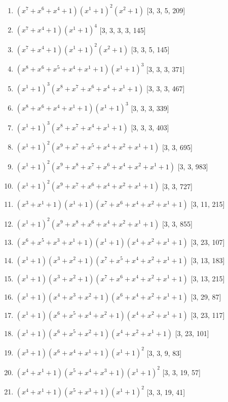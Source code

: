 \documentclass[10pt,twocolumn]{article}
\begin{document}
\begin{enumerate}
\item $(x^{7} + x^{6} + x^{4} + 1)(x^{1} + 1)^{2}(x^{2} + 1)$  [3, 3, 5, 209]
\item $(x^{7} + x^{4} + 1)(x^{1} + 1)^{4}$  [3, 3, 3, 3, 145]
\item $(x^{7} + x^{4} + 1)(x^{1} + 1)^{2}(x^{2} + 1)$  [3, 3, 5, 145]
\item $(x^{8} + x^{6} + x^{5} + x^{4} + x^{1} + 1)(x^{1} + 1)^{3}$  [3, 3, 3, 371]
\item $(x^{1} + 1)^{3}(x^{8} + x^{7} + x^{6} + x^{4} + x^{1} + 1)$  [3, 3, 3, 467]
\item $(x^{8} + x^{6} + x^{4} + x^{1} + 1)(x^{1} + 1)^{3}$  [3, 3, 3, 339]
\item $(x^{1} + 1)^{3}(x^{8} + x^{7} + x^{4} + x^{1} + 1)$  [3, 3, 3, 403]
\item $(x^{1} + 1)^{2}(x^{9} + x^{7} + x^{5} + x^{4} + x^{2} + x^{1} + 1)$  [3, 3, 695]
\item $(x^{1} + 1)^{2}(x^{9} + x^{8} + x^{7} + x^{6} + x^{4} + x^{2} + x^{1} + 1)$  [3, 3, 983]
\item $(x^{1} + 1)^{2}(x^{9} + x^{7} + x^{6} + x^{4} + x^{2} + x^{1} + 1)$  [3, 3, 727]
\item $(x^{3} + x^{1} + 1)(x^{1} + 1)(x^{7} + x^{6} + x^{4} + x^{2} + x^{1} + 1)$  [3, 11, 215]
\item $(x^{1} + 1)^{2}(x^{9} + x^{8} + x^{6} + x^{4} + x^{2} + x^{1} + 1)$  [3, 3, 855]
\item $(x^{6} + x^{5} + x^{3} + x^{1} + 1)(x^{1} + 1)(x^{4} + x^{2} + x^{1} + 1)$  [3, 23, 107]
\item $(x^{1} + 1)(x^{3} + x^{2} + 1)(x^{7} + x^{5} + x^{4} + x^{2} + x^{1} + 1)$  [3, 13, 183]
\item $(x^{1} + 1)(x^{3} + x^{2} + 1)(x^{7} + x^{6} + x^{4} + x^{2} + x^{1} + 1)$  [3, 13, 215]
\item $(x^{1} + 1)(x^{4} + x^{3} + x^{2} + 1)(x^{6} + x^{4} + x^{2} + x^{1} + 1)$  [3, 29, 87]
\item $(x^{1} + 1)(x^{6} + x^{5} + x^{4} + x^{2} + 1)(x^{4} + x^{2} + x^{1} + 1)$  [3, 23, 117]
\item $(x^{1} + 1)(x^{6} + x^{5} + x^{2} + 1)(x^{4} + x^{2} + x^{1} + 1)$  [3, 23, 101]
\item $(x^{3} + 1)(x^{6} + x^{4} + x^{1} + 1)(x^{1} + 1)^{2}$  [3, 3, 9, 83]
\item $(x^{4} + x^{1} + 1)(x^{5} + x^{4} + x^{3} + 1)(x^{1} + 1)^{2}$  [3, 3, 19, 57]
\item $(x^{4} + x^{1} + 1)(x^{5} + x^{3} + 1)(x^{1} + 1)^{2}$  [3, 3, 19, 41]

\end{enumerate}
\end{document}
